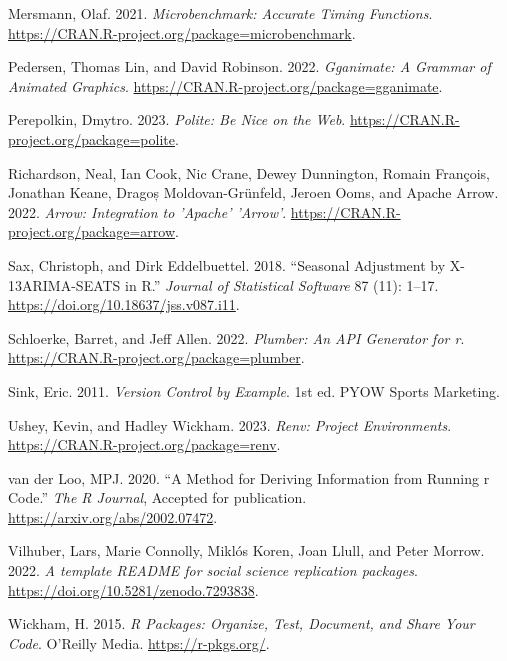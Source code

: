 \documentclass[
  12pt,
  letterpaper,
]{krantz}
\newlength{\cslhangindent}
\newlength{\cslentryspacingunit} %
\newenvironment{CSLReferences}[2] %
 {%
  \setlength{\parindent}{0pt}
  \ifodd #1
  \let\oldpar\par
  \def\par{\hangindent=\cslhangindent\oldpar}
  \fi
  \setlength{\parskip}{#2\cslentryspacingunit}
 }%
 {}
\begin{document}
\begin{CSLReferences}{1}{0}
\leavevmode{}%
Mersmann, Olaf. 2021. \emph{Microbenchmark: Accurate Timing Functions}.
\url{https://CRAN.R-project.org/package=microbenchmark}.

\leavevmode{}%
Pedersen, Thomas Lin, and David Robinson. 2022. \emph{Gganimate: A
Grammar of Animated Graphics}.
\url{https://CRAN.R-project.org/package=gganimate}.

\leavevmode{}%
Perepolkin, Dmytro. 2023. \emph{Polite: Be Nice on the Web}.
\url{https://CRAN.R-project.org/package=polite}.

\leavevmode{}%
Richardson, Neal, Ian Cook, Nic Crane, Dewey Dunnington, Romain
François, Jonathan Keane, Dragoș Moldovan-Grünfeld, Jeroen Ooms, and
Apache Arrow. 2022. \emph{Arrow: Integration to 'Apache' 'Arrow'}.
\url{https://CRAN.R-project.org/package=arrow}.

\leavevmode{}%
Sax, Christoph, and Dirk Eddelbuettel. 2018. {``Seasonal Adjustment by
{X-13ARIMA-SEATS} in {R}.''} \emph{Journal of Statistical Software} 87
(11): 1--17. \url{https://doi.org/10.18637/jss.v087.i11}.

\leavevmode{}%
Schloerke, Barret, and Jeff Allen. 2022. \emph{Plumber: An API Generator
for r}. \url{https://CRAN.R-project.org/package=plumber}.

\leavevmode{}%
Sink, Eric. 2011. \emph{Version Control by Example}. 1st ed. PYOW Sports
Marketing.

\leavevmode{}%
Ushey, Kevin, and Hadley Wickham. 2023. \emph{Renv: Project
Environments}. \url{https://CRAN.R-project.org/package=renv}.

\leavevmode{}%
van der Loo, MPJ. 2020. {``A Method for Deriving Information from
Running r Code.''} \emph{The R Journal}, Accepted for publication.
\url{https://arxiv.org/abs/2002.07472}.

\leavevmode{}%
Vilhuber, Lars, Marie Connolly, Miklós Koren, Joan Llull, and Peter
Morrow. 2022. \emph{{A template README for social science replication
packages}}. \url{https://doi.org/10.5281/zenodo.7293838}.

\leavevmode{}%
Wickham, H. 2015. \emph{R Packages: Organize, Test, Document, and Share
Your Code}. O'Reilly Media. \url{https://r-pkgs.org/}.


\end{CSLReferences}
\end{document}
